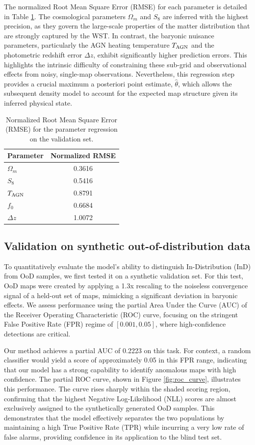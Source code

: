 \documentclass[]{article}
\begin{document}
The normalized Root Mean Square Error (RMSE) for each parameter is detailed in Table \ref{tab:rmse}. The cosmological parameters $\Omega_m$ and $S_8$ are inferred with the highest precision, as they govern the large-scale properties of the matter distribution that are strongly captured by the WST. In contrast, the baryonic nuisance parameters, particularly the AGN heating temperature $T_{\rm AGN}$ and the photometric redshift error $\Delta z$, exhibit significantly higher prediction errors. This highlights the intrinsic difficulty of constraining these sub-grid and observational effects from noisy, single-map observations. Nevertheless, this regression step provides a crucial maximum a posteriori point estimate, $\hat{\theta}$, which allows the subsequent density model to account for the expected map structure given its inferred physical state.

\begin{table}[h!]
\centering
\caption{Normalized Root Mean Square Error (RMSE) for the parameter regression on the validation set.}
\label{tab:rmse}
\begin{tabular}{lc}
\hline
\hline
Parameter & Normalized RMSE \\
\hline
$\Omega_m$ & 0.3616 \\
$S_8$ & 0.5416 \\
$T_{\rm AGN}$ & 0.8791 \\
$f_0$ & 0.6684 \\
$\Delta z$ & 1.0072 \\
\hline
\end{tabular}
\end{table}

\subsection{Validation on synthetic out-of-distribution data}
To quantitatively evaluate the model's ability to distinguish In-Distribution (InD) from OoD samples, we first tested it on a synthetic validation set. For this test, OoD maps were created by applying a 1.3x rescaling to the noiseless convergence signal of a held-out set of maps, mimicking a significant deviation in baryonic effects. We assess performance using the partial Area Under the Curve (AUC) of the Receiver Operating Characteristic (ROC) curve, focusing on the stringent False Positive Rate (FPR) regime of $[0.001, 0.05]$, where high-confidence detections are critical.

Our method achieves a partial AUC of 0.2223 on this task. For context, a random classifier would yield a score of approximately 0.05 in this FPR range, indicating that our model has a strong capability to identify anomalous maps with high confidence. The partial ROC curve, shown in Figure \ref{fig:roc_curve}, illustrates this performance. The curve rises sharply within the shaded scoring region, confirming that the highest Negative Log-Likelihood (NLL) scores are almost exclusively assigned to the synthetically generated OoD samples. This demonstrates that the model effectively separates the two populations by maintaining a high True Positive Rate (TPR) while incurring a very low rate of false alarms, providing confidence in its application to the blind test set.
\end{document}
